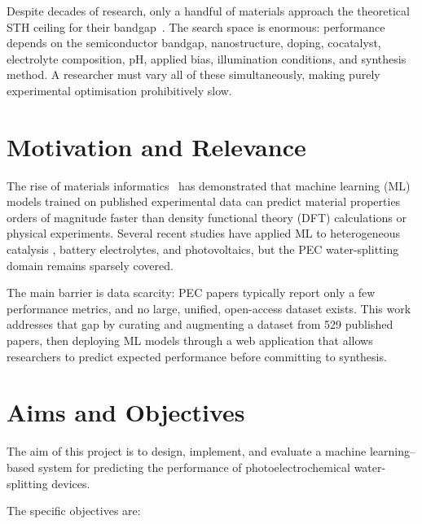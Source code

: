 Despite decades of research, only a handful of materials approach the theoretical
STH ceiling for their bandgap~\cite{walter2010solar}.
The search space is enormous: performance depends on the semiconductor bandgap,
nanostructure, doping, cocatalyst, electrolyte composition, pH, applied bias,
illumination conditions, and synthesis method.
A researcher must vary all of these simultaneously, making purely experimental
optimisation prohibitively slow.

\section{Motivation and Relevance}

The rise of materials informatics~\cite{ramprasad2017machine} has demonstrated
that machine learning (ML) models trained on published experimental data can
predict material properties orders of magnitude faster than density functional
theory (DFT) calculations or physical experiments.
Several recent studies have applied ML to heterogeneous catalysis
\cite{goldsmith2018machine}, battery electrolytes, and photovoltaics,
but the PEC water-splitting domain remains sparsely covered.

The main barrier is data scarcity: PEC papers typically report only a few
performance metrics, and no large, unified, open-access dataset exists.
This work addresses that gap by curating and augmenting a dataset from 529
published papers, then deploying ML models through a web application that
allows researchers to predict expected performance before committing to
synthesis.

\section{Aims and Objectives}

The aim of this project is to design, implement, and evaluate a machine
learning--based system for predicting the performance of photoelectrochemical
water-splitting devices.

\noindent The specific objectives are:

